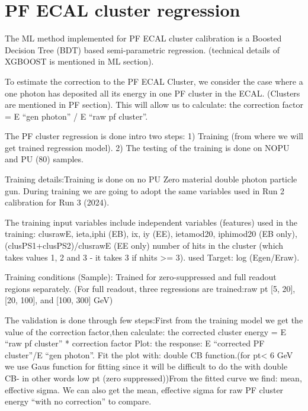 \section{PF ECAL cluster regression}

The ML method implemented for PF ECAL cluster calibration is a Boosted Decision Tree (BDT) based semi-parametric regression. (technical details of XGBOOST is mentioned in ML section).

To estimate the correction to the PF ECAL Cluster, we consider the case where a one photon has deposited all its energy in one PF cluster in the ECAL. (Clusters are mentioned in PF section). This will allow us to calculate: the correction factor = E “gen photon” / E “raw pf cluster”.

The PF cluster regression is done intro two steps:  
1) Training (from where we will get trained regression model). %
2) The testing of the training is done on NOPU and PU (80) samples. %

Training details:Training is done on no PU Zero material double photon particle gun. During training we are going to adopt the same variables used in Run 2 calibration for Run 3 (2024). 

The training input variables include independent variables (features) used in the training:  clusrawE, ieta,iphi (EB), ix, iy (EE), ietamod20, iphimod20 (EB only), (clusPS1+clusPS2)/clusrawE (EE only) number of hits in the cluster (which takes values 1, 2 and 3 - it takes 3 if nhits >= 3).
used Target: log (Egen/Eraw). %

Training conditions (Sample): Trained for zero-suppressed and full readout regions separately.
(For full readout, three regressions are trained:raw pt [5, 20], [20, 100], and [100, 300] GeV) 

The validation is done through few steps:First from the training model we get the value of the correction factor,then calculate: the corrected cluster energy = E “raw pf cluster” * correction factor 
Plot: the response: E “corrected PF cluster”/E “gen photon”. Fit the plot with: double CB function.(for pt< 6 GeV we use Gaus function for fitting since it will be difficult to do the with double CB- in other words low pt (zero suppressed))From the fitted curve we find: mean, effective sigma. We can also get the mean, effective sigma for raw PF cluster energy “with no correction” to compare. 

